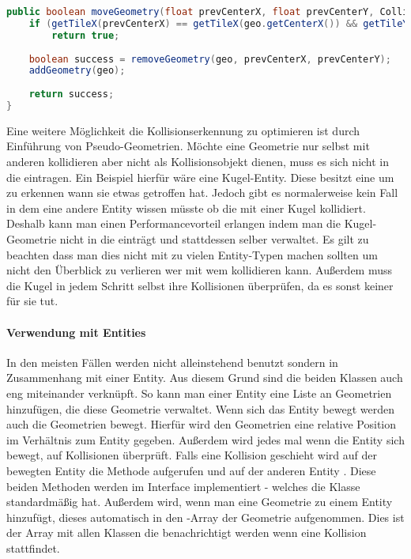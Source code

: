 \doinline
\begin{lstlisting}[caption=Bewegen einer Geometrie in der CollisionMap, title=\hspace{0 pt}, language=java]
public boolean moveGeometry(float prevCenterX, float prevCenterY, CollisionGeometry geo) {
	if (getTileX(prevCenterX) == getTileX(geo.getCenterX()) && getTileY(prevCenterY) == getTileY(geo.getCenterY()))
		return true;
	
	boolean success = removeGeometry(geo, prevCenterX, prevCenterY);
	addGeometry(geo);
	
	return success;
}
\end{lstlisting}

Eine weitere Möglichkeit die Kollisionserkennung zu optimieren ist durch Einführung von Pseudo-Geometrien. Möchte eine Geometrie nur selbst mit anderen kollidieren aber nicht als Kollisionsobjekt dienen, muss es sich nicht in die  eintragen. Ein Beispiel hierfür wäre eine Kugel-Entity.
Diese besitzt eine  um zu erkennen wann sie etwas getroffen hat. Jedoch gibt es normalerweise kein Fall in dem eine andere Entity wissen müsste ob die mit einer Kugel kollidiert.
Deshalb kann man einen Performancevorteil erlangen indem man die Kugel-Geometrie nicht in die  einträgt und stattdessen selber verwaltet. Es gilt zu beachten dass man dies nicht mit zu vielen Entity-Typen machen sollten um nicht den Überblick zu verlieren wer mit wem kollidieren kann.
Außerdem muss die Kugel in jedem Schritt selbst ihre Kollisionen überprüfen, da es sonst keiner für sie tut.

\paragraph{Verwendung mit Entities}

In den meisten Fällen werden  nicht alleinstehend benutzt sondern in Zusammenhang mit einer Entity. Aus diesem Grund sind die beiden Klassen auch eng miteinander verknüpft. So kann man einer Entity eine Liste an Geometrien hinzufügen, die diese Geometrie verwaltet. Wenn sich das Entity bewegt werden auch die Geometrien bewegt. Hierfür wird den Geometrien eine relative Position im Verhältnis zum Entity gegeben.
Außerdem wird jedes mal wenn die Entity sich bewegt, auf Kollisionen überprüft. Falls eine Kollision geschieht wird auf der bewegten Entity die Methode  aufgerufen und auf der anderen Entity . Diese beiden Methoden werden im Interface  implementiert - welches die Klasse  standardmäßig hat. Außerdem wird, wenn man eine Geometrie zu einem Entity hinzufügt, dieses automatisch in den -Array der Geometrie aufgenommen. Dies ist der Array mit allen Klassen die benachrichtigt werden wenn eine Kollision stattfindet.

